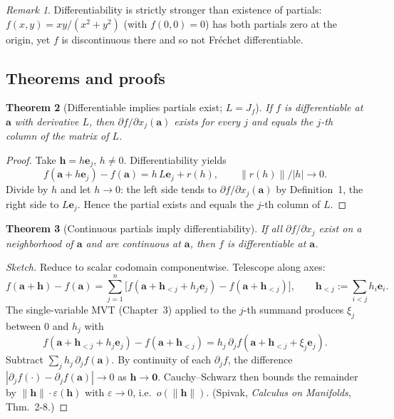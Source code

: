 \documentclass[11pt]{article}
\newtheorem{theorem}{Theorem}[section]
\theoremstyle{remark}
\newtheorem{remark}[theorem]{Remark}
\begin{document}
\begin{remark}
Differentiability is strictly stronger than existence of partials: $f(x,y)=xy/(x^2+y^2)$ (with $f(0,0)=0$) has both partials zero at the origin, yet $f$ is discontinuous there and so not Fr\'echet differentiable.
\end{remark}

\subsection*{Theorems and proofs}

\begin{theorem}[Differentiable implies partials exist; $L=J_f$]
If $f$ is differentiable at $\mathbf{a}$ with derivative $L$, then $\partial f/\partial x_j(\mathbf{a})$ exists for every $j$ and equals the $j$-th column of the matrix of $L$.
\end{theorem}

\begin{proof}
Take $\mathbf{h}=h\mathbf{e}_j$, $h\neq 0$. Differentiability yields
\[
f(\mathbf{a}+h\mathbf{e}_j)-f(\mathbf{a}) = h\,L\mathbf{e}_j + r(h),\qquad \|r(h)\|/|h|\to 0.
\]
Divide by $h$ and let $h\to 0$: the left side tends to $\partial f/\partial x_j(\mathbf{a})$ by Definition~1, the right side to $L\mathbf{e}_j$. Hence the partial exists and equals the $j$-th column of $L$.
\end{proof}

\begin{theorem}[Continuous partials imply differentiability]
If all $\partial f/\partial x_j$ exist on a neighborhood of $\mathbf{a}$ and are continuous at $\mathbf{a}$, then $f$ is differentiable at $\mathbf{a}$.
\end{theorem}

\begin{proof}[Sketch]
Reduce to scalar codomain componentwise. Telescope along axes:
\[
f(\mathbf{a}+\mathbf{h})-f(\mathbf{a}) = \sum_{j=1}^n\!\Big[f(\mathbf{a}+\mathbf{h}_{<j}+h_j\mathbf{e}_j)-f(\mathbf{a}+\mathbf{h}_{<j})\Big],\qquad \mathbf{h}_{<j}:=\!\!\sum_{i<j} h_i\mathbf{e}_i.
\]
The single-variable MVT (Chapter~3) applied to the $j$-th summand produces $\xi_j$ between $0$ and $h_j$ with
\[
f(\mathbf{a}+\mathbf{h}_{<j}+h_j\mathbf{e}_j)-f(\mathbf{a}+\mathbf{h}_{<j}) = h_j\,\partial_j f(\mathbf{a}+\mathbf{h}_{<j}+\xi_j\mathbf{e}_j).
\]
Subtract $\sum_j h_j\,\partial_j f(\mathbf{a})$. By continuity of each $\partial_j f$, the difference $|\partial_j f(\cdot)-\partial_j f(\mathbf{a})|\to 0$ as $\mathbf{h}\to\mathbf{0}$. Cauchy--Schwarz then bounds the remainder by $\|\mathbf{h}\|\cdot \varepsilon(\mathbf{h})$ with $\varepsilon\to 0$, i.e.\ $o(\|\mathbf{h}\|)$. (Spivak, \emph{Calculus on Manifolds}, Thm.~2-8.)
\end{proof}
\end{document}
